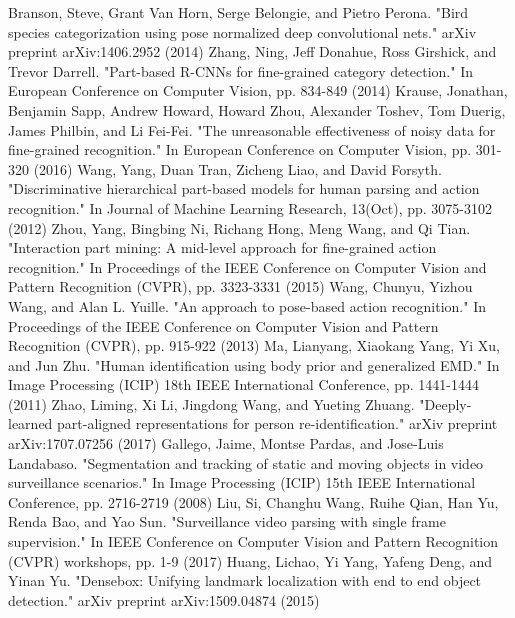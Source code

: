 \begin{thebibliography}{}
%
Branson, Steve, Grant Van Horn, Serge Belongie, and Pietro Perona. "Bird species categorization using pose normalized deep convolutional nets." arXiv preprint arXiv:1406.2952 (2014)
Zhang, Ning, Jeff Donahue, Ross Girshick, and Trevor Darrell. "Part-based R-CNNs for fine-grained category detection." In European Conference on Computer Vision, pp. 834-849 (2014)
Krause, Jonathan, Benjamin Sapp, Andrew Howard, Howard Zhou, Alexander Toshev, Tom Duerig, James Philbin, and Li Fei-Fei. "The unreasonable effectiveness of noisy data for fine-grained recognition." In European Conference on Computer Vision, pp. 301-320 (2016)
%
Wang, Yang, Duan Tran, Zicheng Liao, and David Forsyth. "Discriminative hierarchical part-based models for human parsing and action recognition." In Journal of Machine Learning Research, 13(Oct), pp. 3075-3102 (2012)
Zhou, Yang, Bingbing Ni, Richang Hong, Meng Wang, and Qi Tian. "Interaction part mining: A mid-level approach for fine-grained action recognition." In Proceedings of the IEEE Conference on Computer Vision and Pattern Recognition (CVPR), pp. 3323-3331 (2015)
Wang, Chunyu, Yizhou Wang, and Alan L. Yuille. "An approach to pose-based action recognition." In Proceedings of the IEEE Conference on Computer Vision and Pattern Recognition (CVPR), pp. 915-922 (2013)
%
Ma, Lianyang, Xiaokang Yang, Yi Xu, and Jun Zhu. "Human identification using body prior and generalized EMD." In Image Processing (ICIP) 18th IEEE International Conference, pp. 1441-1444 (2011)
Zhao, Liming, Xi Li, Jingdong Wang, and Yueting Zhuang. "Deeply-learned part-aligned representations for person re-identification." arXiv preprint arXiv:1707.07256 (2017)
%
Gallego, Jaime, Montse Pardas, and Jose-Luis Landabaso. "Segmentation and tracking of static and moving objects in video surveillance scenarios." In Image Processing (ICIP) 15th IEEE International Conference, pp. 2716-2719 (2008)
Liu, Si, Changhu Wang, Ruihe Qian, Han Yu, Renda Bao, and Yao Sun. "Surveillance video parsing with single frame supervision." In IEEE Conference on Computer Vision and Pattern Recognition (CVPR) workshops, pp. 1-9 (2017)
% 
Huang, Lichao, Yi Yang, Yafeng Deng, and Yinan Yu. "Densebox: Unifying landmark localization with end to end object detection." arXiv preprint arXiv:1509.04874 (2015)

\end{thebibliography}
